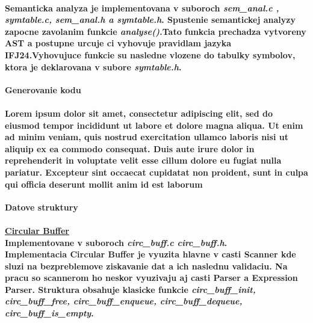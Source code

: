 \documentclass[12pt]{article}
\begin{document}
\paragraph{Semanticka analyza je implementovana v suboroch \textit{sem\_anal.c , symtable.c, sem\_anal.h a symtable.h}. Spustenie semantickej analyzy zapocne zavolanim funkcie \textit{analyse()}.Tato funkcia prechadza vytvoreny AST a postupne urcuje ci vyhovuje pravidlam jazyka IFJ24.Vyhovujuce funkcie su nasledne vlozene do tabulky symbolov, ktora je deklarovana v subore \textit{symtable.h}. \newline \\}

 \Large \textbf{Generovanie kodu} \normalsize \\
\noindent\makebox[\linewidth]{\rule{\textwidth}{0.4pt}}

\paragraph{Lorem ipsum dolor sit amet, consectetur adipiscing elit, sed do eiusmod tempor incididunt ut labore et dolore magna aliqua. Ut enim ad minim veniam, quis nostrud exercitation ullamco laboris nisi ut aliquip ex ea commodo consequat. Duis aute irure dolor in reprehenderit in voluptate velit esse cillum dolore eu fugiat nulla pariatur. Excepteur sint occaecat cupidatat non proident, sunt in culpa qui officia deserunt mollit anim id est laborum \newline \\}

 \Large \textbf{Datove struktury}\normalsize \\
\noindent\makebox[\linewidth]{\rule{\textwidth}{0.4pt}}

\paragraph{\large \underline{Circular Buffer} \\ Implementovane v suboroch \textit{circ\_buff.c circ\_buff.h}. \\ \newline
Implementacia Circular Buffer je vyuzita hlavne v casti Scanner kde sluzi na bezpreblemove ziskavanie dat a ich naslednu validaciu. Na pracu so scannerom ho neskor vyuzivaju aj casti Parser a Expression Parser. Struktura obsahuje klasicke funkcie \textit{circ\_buff\_init, circ\_buff\_free, circ\_buff\_enqueue, circ\_buff\_dequeue, circ\_buff\_is\_empty}. 
\newline \\}
\end{document}
